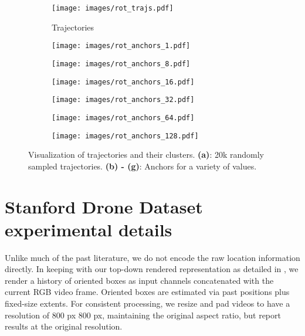 \documentclass{article}
\begin{document}
\begin{figure*}[!htbp]
\centering
  \begin{subfigure}[b]{0.23\textwidth}
    \texttt{[image: images/rot\_trajs.pdf]}
    \caption{Trajectories}
  \end{subfigure}
  \begin{subfigure}[b]{0.23\textwidth}
    \texttt{[image: images/rot\_anchors\_1.pdf]}
    \caption{}
  \end{subfigure}
  \begin{subfigure}[b]{0.23\textwidth}
    \texttt{[image: images/rot\_anchors\_8.pdf]}
    \caption{}
  \end{subfigure}  
  \begin{subfigure}[b]{0.23\textwidth}
    \texttt{[image: images/rot\_anchors\_16.pdf]}
    \caption{}
  \end{subfigure}  
  \begin{subfigure}[b]{0.23\textwidth}
    \texttt{[image: images/rot\_anchors\_32.pdf]}
    \caption{}
  \end{subfigure}  
  \begin{subfigure}[b]{0.23\textwidth}
    \texttt{[image: images/rot\_anchors\_64.pdf]}
    \caption{}
  \end{subfigure}  
  \begin{subfigure}[b]{0.23\textwidth}
    \texttt{[image: images/rot\_anchors\_128.pdf]}
    \caption{}
  \end{subfigure}  
\caption{Visualization of trajectories and their clusters. \textbf{(a)}: 20k randomly sampled trajectories. \textbf{(b) - (g)}: Anchors for a variety of  values.}
\label{fig:clusters_viz}
\end{figure*}

\section{Stanford Drone Dataset experimental details}
\label{sec:sdd_experiment_setup}

Unlike much of the past literature, we do not encode the raw location information directly.  In keeping with our top-down rendered representation as detailed in , we render a history of oriented boxes as input channels concatenated with the current RGB video frame. Oriented boxes are estimated via past positions plus fixed-size extents.  For consistent processing, we resize and pad videos to have a resolution of 800 px  800 px, maintaining the original aspect ratio, but report results at the original resolution.
\end{document}
